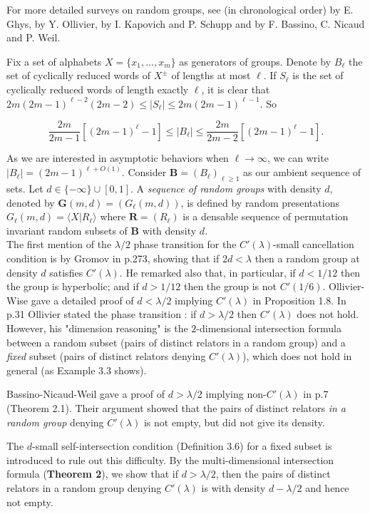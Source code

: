 \documentclass{article}
\newcommand{\bs}{\boldsymbol}
\theoremstyle{remark}
\begin{document}
For more detailed surveys on random groups, see (in chronological order) \cite{Ghys04} by E. Ghys, \cite{Oll05} by Y. Ollivier, \cite{KS08} by I. Kapovich and P. Schupp and \cite{BNW} by F. Bassino, C. Nicaud and P. Weil.

Fix a set of alphabets $X = \{x_1,\dots, x_m\}$ as generators of groups. Denote by $B_\ell$ the set of cyclically reduced words of $X^\pm$ of lengths at most $\ell$. If $S_\ell$ is the set of cyclically reduced words of length exactly $\ell$, it is clear that $2m(2m-1)^{\ell-2}(2m-2) \leq |S_\ell| \leq 2m(2m-1)^{\ell-1}$. So

\[\frac{2m}{2m-1}\left[(2m-1)^\ell-1\right] \leq |B_\ell| \leq \frac{2m}{2m-2}\left[(2m-1)^\ell-1\right].\]

As we are interested in asymptotic behaviors when $\ell\to\infty$, we can write $|B_\ell| = (2m-1)^{\ell+O(1)}$. Consider $\bs B = (B_\ell)_{\ell\geq 1}$ as our ambient sequence of sets. Let $d\in \{-\infty\} \cup[0,1]$. A \textit{sequence of random groups} with density $d$, denoted by $\bs G(m,d) = (G_\ell(m,d))$, is defined by random presentations $G_\ell(m,d) = \langle X | R_\ell \rangle$ where $\bs R = (R_\ell)$ is a densable sequence of permutation invariant random subsets of $\bs B$ with density $d$.\\

The first mention of the $\lambda/2$ phase transition for the $C'(\lambda)$-small cancellation condition is by Gromov in \cite{Gro93} p.273, showing that if $2d<\lambda$ then a random group at density $d$ satisfies $C'(\lambda)$. He remarked also that, in particular, if $d<1/12$ then the group is hyperbolic; and if $d>1/12$ then the group is not $C'(1/6)$. Ollivier-Wise gave a detailed proof of $d<\lambda/2$ implying $C'(\lambda)$ in \cite{OW11} Proposition 1.8. In \cite{Oll05} p.31 Ollivier stated the phase transition : if $d>\lambda/2$ then $C'(\lambda)$ does not hold. However, his "dimension reasoning" is the $2$-dimensional intersection formula between a random subset (pairs of distinct relators in a random group) and a \textit{fixed} subset (pairs of distinct relators denying $C'(\lambda)$), which does not hold in general (as Example 3.3 shows). 

Bassino-Nicaud-Weil gave a proof of $d>\lambda/2$ implying non-$C'(\lambda)$ in \cite{BNW} p.7 (Theorem 2.1). Their argument showed that the pairs of distinct relators \textit{in a random group} denying $C'(\lambda)$ is not empty, but did not give its density.

The $d$-small self-intersection condition (Definition 3.6) for a fixed subset is introduced to rule out this difficulty. By the multi-dimensional intersection formula (\textbf{Theorem 2}), we show that if $d>\lambda/2$, then the pairs of distinct relators in a random group denying $C'(\lambda)$ is with density $d-\lambda/2$ and hence not empty.
\end{document}
